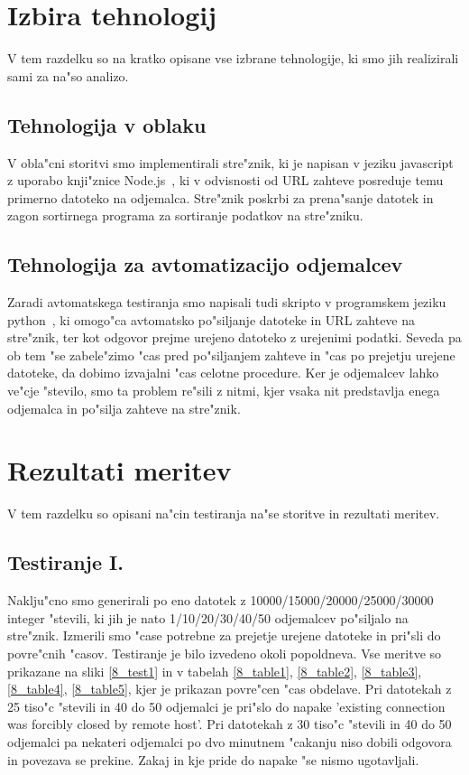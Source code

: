\section{Izbira tehnologij}
V tem razdelku so na kratko opisane vse izbrane tehnologije, ki smo jih realizirali sami za na"so analizo.

\subsection{Tehnologija v oblaku}
V obla"cni storitvi smo implementirali stre"znik, ki je napisan v jeziku javascript z uporabo knji"znice Node.js~\cite{8_nodejs}, ki v odvisnosti od URL zahteve posreduje temu primerno datoteko na odjemalca. Stre"znik poskrbi za prena"sanje datotek in zagon sortirnega programa za sortiranje podatkov na stre"zniku.

\subsection{Tehnologija za avtomatizacijo odjemalcev}
Zaradi avtomatskega testiranja smo napisali tudi skripto v programskem jeziku python~\cite{8_python}, ki omogo"ca avtomatsko po"siljanje datoteke in URL zahteve na stre"znik, ter kot odgovor prejme urejeno datoteko z urejenimi podatki. Seveda pa ob tem "se zabele"zimo "cas pred po"siljanjem zahteve in "cas po prejetju urejene datoteke, da dobimo izvajalni "cas celotne procedure. Ker je odjemalcev lahko ve"cje "stevilo, smo ta problem re"sili z nitmi, kjer vsaka nit predstavlja enega odjemalca in po"silja zahteve na stre"znik.

\section{Rezultati meritev}
V tem razdelku so opisani na"cin testiranja na"se  storitve in rezultati meritev.

\subsection{Testiranje I.}
Naklju"cno smo generirali po eno datotek z 10000/15000/20000/25000/30000 integer "stevili, ki jih je nato 1/10/20/30/40/50 odjemalcev po"siljalo na stre"znik. Izmerili smo "case potrebne za prejetje urejene datoteke in pri"sli do povre"cnih "casov. Testiranje je bilo izvedeno okoli popoldneva.  Vse meritve so prikazane na sliki \ref{8_test1} in v tabelah \ref{8_table1}, \ref{8_table2}, \ref{8_table3}, \ref{8_table4}, \ref{8_table5}, kjer je prikazan povre"cen "cas obdelave. Pri datotekah z 25 tiso"c "stevili in 40 do 50 odjemalci je pri"slo do napake 'existing connection was forcibly closed by remote host'. Pri datotekah z 30 tiso"c "stevili in 40 do 50 odjemalci pa nekateri odjemalci po dvo minutnem "cakanju niso dobili odgovora in povezava se prekine. Zakaj in kje pride do napake "se nismo ugotavljali.\\\\

